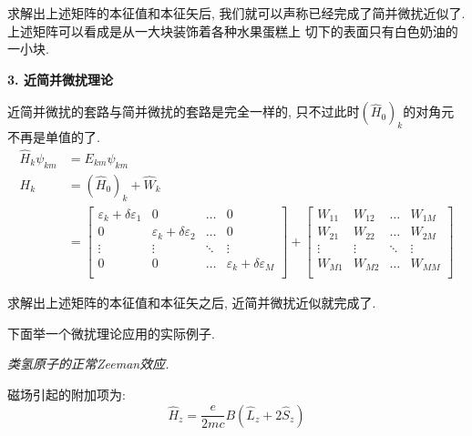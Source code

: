 \documentclass[a4paper, 11pt]{article}
\begin{document}
\begin{spacing}{1.2}
          求解出上述矩阵的本征值和本征矢后, 我们就可以声称已经完成了简并微扰近似了. 上述矩阵可以看成是从一大块装饰着各种水果蛋糕上%
          切下的表面只有白色奶油的一小块. 
          
          \textbf{3. 近简并微扰理论}

          近简并微扰的套路与简并微扰的套路是完全一样的, 只不过此时$(\hat{H}_0)_k$的对角元不再是单值的了.
          \begin{equation}
            \begin{aligned}
              \hat{H}_k\psi_{km} &= E_{km}\psi_{km} \\
              H_k &=(\hat{H}_0)_k + \hat{W}_k\\
                  &=\begin{bmatrix}
                    \varepsilon_k+\delta\varepsilon_1 & 0 & \ldots & 0\\
                    0 & \varepsilon_k+\delta\varepsilon_2 & \ldots & 0\\
                    \vdots & \vdots & \ddots & \vdots\\
                    0 & 0 & \ldots & \varepsilon_k+\delta\varepsilon_M\\
                    \end{bmatrix} + %
                    \begin{bmatrix}
                      W_{11} & W_{12} & \ldots & W_{1M}\\
                      W_{21} & W_{22} & \ldots & W_{2M}\\
                      \vdots & \vdots & \ddots & \vdots\\
                      W_{M1} & W_{M2} & \ldots & W_{MM}\\
                      \end{bmatrix}  
            \end{aligned}
          \end{equation}

          求解出上述矩阵的本征值和本征矢之后, 近简并微扰近似就完成了. 

          下面举一个微扰理论应用的实际例子. 
          
          \emph{类氢原子的正常Zeeman效应.}

          磁场引起的附加项为:
          \begin{equation}
            \hat{H}_z = \dfrac{e}{2mc}B\left(\hat{L}_z+2\hat{S}_z\right)
          \end{equation}


\end{spacing}
\end{document}
